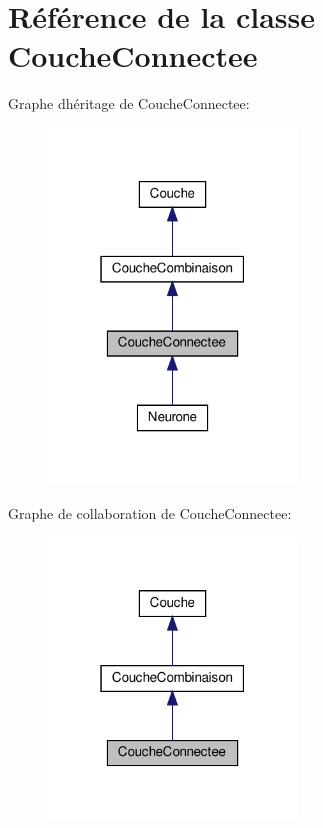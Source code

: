 \hypertarget{classCoucheConnectee}{}\section{Référence de la classe Couche\+Connectee}
\label{classCoucheConnectee}


Graphe d\textquotesingle{}héritage de Couche\+Connectee\+:
\nopagebreak
\begin{figure}[H]
\begin{center}
\leavevmode
\includegraphics[width=187pt]{classCoucheConnectee__inherit__graph}
\end{center}
\end{figure}


Graphe de collaboration de Couche\+Connectee\+:
\nopagebreak
\begin{figure}[H]
\begin{center}
\leavevmode
\includegraphics[width=187pt]{classCoucheConnectee__coll__graph}
\end{center}
\end{figure}
